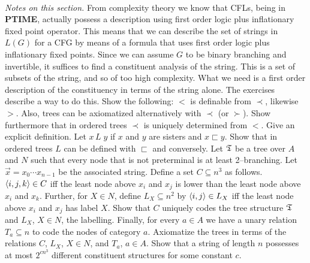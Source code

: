 \proofend
\\
{\it Notes on this section.} From complexity theory we know that
CFLs, being in \textbf{PTIME}, actually possess a description using 
first order logic plus inflationary fixed point operator. This means 
that we can describe the set of strings in $L(G)$ for a CFG by means 
of a formula that uses first order logic plus inflationary fixed points. 
Since we can assume $G$ to be binary branching and invertible, it
suffices to find a constituent analysis of the string. This is a
set of subsets of the string, and so of too high complexity. What
we need is a first order description of the constituency in terms
of the string alone. The exercises describe a way to do this.
\vplatz
\exercise
Show the following: $<$ is definable from $\prec$, likewise $>$.
Also, trees can be axiomatized alternatively with $\prec$ (or
$\succ$). Show furthermore that in ordered trees $\prec$
is uniquely determined from $<$. Give an explicit definition.
\vplatz
\exercise
Let $x\, L\; y$ if $x$ and $y$ are sisters and $x \sqsubset y$.
Show that in ordered trees $L$ can be defined with $\sqsubset$
and conversely.
\vplatz
\exercise
Let $\mathfrak{T}$ be a tree over $A$ and $N$ such that every node that
is not preterminal is at least 2--branching. Let $\vec{x} =
x_0\dotsb x_{n-1}$ be the associated string. Define a set
$C \subseteq n^3$ as follows. $\langle i,j,k\rangle \in C$ iff
the least node above $x_i$ and $x_j$ is lower
than the least node above $x_i$ and $x_k$. Further, for $X \in N$,
define $L_X \subseteq n^2$ by $\langle i,j\rangle \in L_X$ iff
the least node above $x_i$ and $x_j$ has label $X$. Show that
$C$ uniquely codes the tree structure $\mathfrak{T}$ and $L_X$, $X \in N$,
the labelling. Finally, for every $a \in A$ we have a unary
relation $T_a \subseteq n$ to code the nodes of category $a$.
Axiomatize the trees in terms of the relations $C$, $L_X$, $X \in N$,
and $T_a$, $a \in A$.
\vplatz
\exercise
Show that a string of length $n$ possesses at most $2^{c n^3}$
different constituent structures for some constant $c$.
